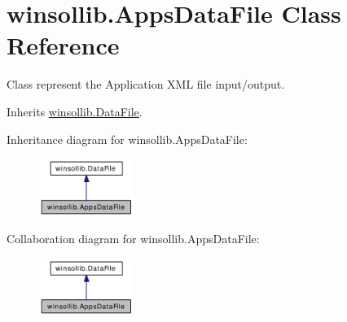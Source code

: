 \hypertarget{classwinsollib_1_1AppsDataFile}{
\section{winsollib.Apps\-Data\-File Class Reference}
\label{classwinsollib_1_1AppsDataFile}
}
Class represent the Application XML file input/output.  


Inherits \hyperlink{classwinsollib_1_1DataFile}{winsollib.Data\-File}.

Inheritance diagram for winsollib.Apps\-Data\-File:\begin{figure}[H]
\begin{center}
\leavevmode
\includegraphics[width=87pt]{classwinsollib_1_1AppsDataFile__inherit__graph}
\end{center}
\end{figure}
Collaboration diagram for winsollib.Apps\-Data\-File:\begin{figure}[H]
\begin{center}
\leavevmode
\includegraphics[width=87pt]{classwinsollib_1_1AppsDataFile__coll__graph}
\end{center}
\end{figure}
